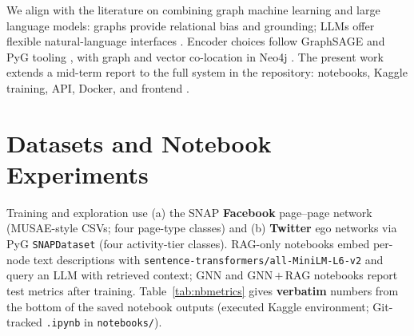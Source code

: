 \documentclass[conference]{IEEEtran}
\begin{document}
We align with the literature on combining graph machine learning and large language models: graphs provide relational bias and grounding; LLMs offer flexible natural-language interfaces \cite{acm_survey_gml_llm}. Encoder choices follow GraphSAGE \cite{hamilton2017graphsage} and PyG tooling \cite{pyg}, with graph and vector co-location in Neo4j \cite{neo4j_vector,arch_md}. The present work extends a mid-term report \cite{midterm_internal} to the full system in the repository: notebooks, Kaggle training, API, Docker, and frontend \cite{frontend_api_guide}.

\section{Datasets and Notebook Experiments}

Training and exploration use (a) the SNAP \textbf{Facebook} page--page network (MUSAE-style CSVs; four page-type classes) and (b) \textbf{Twitter} ego networks via PyG \texttt{SNAPDataset} (four activity-tier classes). RAG-only notebooks embed per-node text descriptions with \texttt{sentence-transformers/all-MiniLM-L6-v2} and query an LLM with retrieved context; GNN and GNN\,$+$\,RAG notebooks report test metrics after training. Table~\ref{tab:nbmetrics} gives \textbf{verbatim} numbers from the bottom of the saved notebook outputs (executed Kaggle environment; Git-tracked \texttt{.ipynb} in \texttt{notebooks/}).
\end{document}
